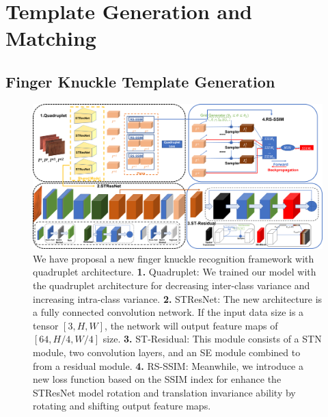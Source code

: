 \section{Template Generation and Matching\label{template-generation}}

\subsection{Finger Knuckle Template Generation\label{fk-template}}

\begin{figure}
    \centering
    \includegraphics[width=6.5in]{Figures/framework/ST-Residual/Framework.png}
    \caption{We have proposal a new finger knuckle recognition framework with quadruplet architecture. \textbf{1.} Quadruplet: We trained our model with the quadruplet architecture \cite{chen2017beyond} for decreasing inter-class variance and increasing intra-class variance. \textbf{2.} STResNet: The new architecture is a fully connected convolution network. If the input data size is a tensor $[3, H, W]$, the network will output feature maps of $[64, H/4, W/4]$ size. \textbf{3.} ST-Residual: This module consists of a STN \cite{jaderberg2015spatial} module, two convolution layers, and an SE \cite{hu2018squeeze} module combined to from a residual module.
     \textbf{4.} RS-SSIM: Meanwhile, we introduce a new loss function based on the SSIM index for enhance the STResNet model rotation and translation invariance ability by rotating and shifting output feature maps.}
    \label{framework}
\end{figure}

